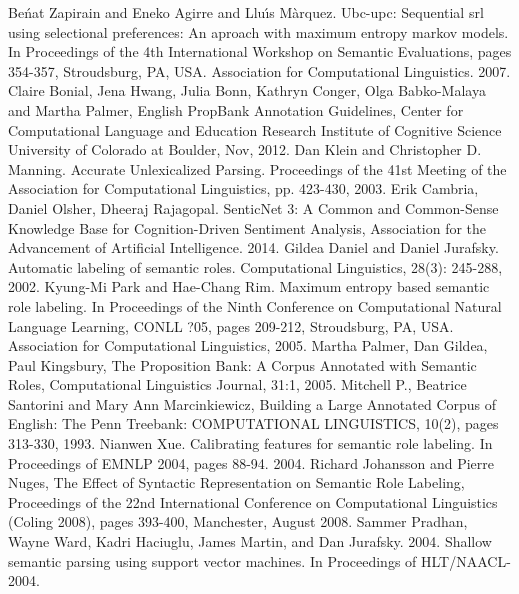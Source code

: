 \documentclass[runningheads,a4paper]{llncs}
\begin{document}
\begin{thebibliography}{4}
 Be\'{n}at Zapirain and Eneko Agirre and Llu\'{\i}s M\`{a}rquez. Ubc-upc: Sequential srl using selectional preferences: An aproach with maximum entropy markov models. In Proceedings of the 4th International Workshop on Semantic Evaluations, pages 354-357, Stroudsburg, PA, USA. Association for Computational Linguistics. 2007.
 Claire Bonial, Jena Hwang, Julia Bonn, Kathryn Conger, Olga Babko-Malaya and Martha Palmer, English PropBank Annotation Guidelines, Center for Computational Language and Education Research Institute of Cognitive Science University of Colorado at Boulder, Nov, 2012.
 Dan Klein and Christopher D. Manning. Accurate Unlexicalized Parsing. Proceedings of the 41st Meeting of the Association for Computational Linguistics, pp. 423-430, 2003.
 Erik Cambria, Daniel Olsher, Dheeraj Rajagopal. SenticNet 3: A Common and Common-Sense Knowledge Base for Cognition-Driven Sentiment Analysis, Association for the Advancement of Artificial Intelligence. 2014. 
 Gildea Daniel and Daniel Jurafsky. Automatic labeling of semantic roles. Computational Linguistics, 28(3): 245-288, 2002.
 Kyung-Mi Park and Hae-Chang Rim. Maximum entropy based semantic role labeling. In Proceedings of the Ninth Conference on Computational Natural Language Learning, CONLL ?05, pages 209-212, Stroudsburg, PA, USA. Association for Computational Linguistics, 2005.
 Martha Palmer, Dan Gildea, Paul Kingsbury, The Proposition Bank: A Corpus Annotated with Semantic Roles, Computational Linguistics Journal, 31:1, 2005.
 Mitchell P., Beatrice Santorini and Mary Ann Marcinkiewicz, Building a Large Annotated Corpus of English: The Penn Treebank: COMPUTATIONAL LINGUISTICS, 10(2), pages 313-330, 1993.
 Nianwen Xue. Calibrating features for semantic role labeling. In Proceedings of EMNLP 2004, pages 88-94. 2004.
 Richard Johansson and Pierre Nuges, The Effect of Syntactic Representation on Semantic Role Labeling, Proceedings of the 22nd International Conference on Computational Linguistics (Coling 2008), pages 393-400, Manchester, August 2008.
 Sammer Pradhan, Wayne Ward, Kadri Haciuglu, James Martin, and Dan Jurafsky. 2004. Shallow semantic parsing using support vector machines. In Proceedings of HLT/NAACL-2004.


\end{thebibliography}
\end{document}
